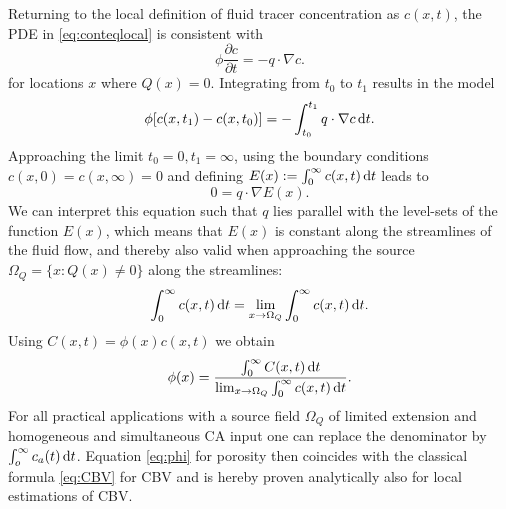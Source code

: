\documentclass[paper=a4, fontsize=11pt,parskip=half,headings=small]{scrartcl}
\begin{document}
	Returning to the local definition of fluid tracer concentration as $c(x,t)$, the PDE in \eqref{eq:conteqlocal} is consistent with
	\begin{equation}
		\phi\frac{\partial c}{\partial t}  = - q \cdot \nabla c.
		\label{eq:1cmodel}
	\end{equation}
	for locations $x$ where $Q(x) = 0$.
	Integrating from $t_0$ to $t_1$ results in the model
	\begin{equation}
		\phi [c(x,t_1) - c(x,t_0)]  = - \int_{t_0}^{t_1}q \cdot  \nabla c \,\mathrm{d} t.
	\end{equation}
	Approaching the limit $t_0 = 0, t_1 = \infty$, using the boundary conditions $c(x,0) = c(x,\infty) = 0$ and defining $E(x):= \int_0^\infty c(x,t) \,\mathrm{d} t$ leads to
	\begin{equation}
		0 = q \cdot \nabla  E(x).
		\label{eq:streamlinezero}
	\end{equation}
	We can interpret this equation such that $q$ lies parallel with the level-sets of the function $E(x)$, which means that $E(x)$ is constant along the streamlines of the fluid flow, and thereby also valid when approaching the source $\Omega_Q = \{x: Q(x) \neq 0\}$ along the streamlines:
	\begin{equation}
		\int_0^\infty c(x,t) \,\mathrm{d} t = \lim_{x \rightarrow \Omega_Q}\int_0^\infty c(x,t) \,\mathrm{d} t.
	\end{equation}
	Using $C(x,t) = \phi(x) c(x,t)$ we obtain
	\begin{equation}
		\phi(x) =  \frac{ \int_{0}^{\infty} C(x,t) \,\mathrm{d} t }{\lim_{x \rightarrow \Omega_Q} \int_{0}^{\infty} c(x,t) \,\mathrm{d} t}.
		\label{eq:phi}
	\end{equation}
	For all practical applications with a source field $\Omega_Q$ of limited extension and homogeneous and simultaneous CA input one can replace the denominator by $\int_o^\infty c_a(t) \,\mathrm{d} t$.
	Equation \eqref{eq:phi} for porosity then coincides with the classical formula \eqref{eq:CBV} for CBV and is hereby proven analytically also for local estimations of CBV.
	
	
	
	

	
\end{document}
